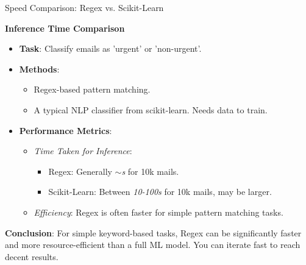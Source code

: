\documentclass{beamer}
\begin{document}
\begin{frame}{Speed Comparison: Regex vs. Scikit-Learn}

\textbf{Inference Time Comparison}

\begin{itemize}
  \item \textbf{Task}: Classify emails as 'urgent' or 'non-urgent'.
  \item \textbf{Methods}:
    \begin{itemize}
      \item Regex-based pattern matching.
      \item A typical NLP classifier from scikit-learn. Needs data to train.
    \end{itemize}
  \item \textbf{Performance Metrics}:
    \begin{itemize}
      \item \textit{Time Taken for Inference}:
        \begin{itemize}
          \item Regex: Generally \textit{$\sim$s} for 10k mails.
          \item Scikit-Learn: Between \textit{10-100s} for 10k mails, may be larger.
        \end{itemize}
      \item \textit{Efficiency}: Regex is often faster for simple pattern matching tasks.
    \end{itemize}
\end{itemize}

\textbf{Conclusion}: For simple keyword-based tasks, Regex can be significantly faster and more resource-efficient than a full ML model. You can iterate fast to reach decent results.

\end{frame}
\end{document}
